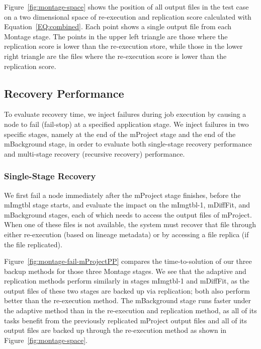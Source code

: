 \documentclass{sig-alternate}
\newcommand{\zhaonote}[1]{{\textcolor{cyan}    { ***Zhao:      #1 }}}
\newcommand{\kylenote}[1]{{\textcolor{orange}    { ***Kyle:      #1 }}}
\newcommand{\zhaonote}[1]{}
\newcommand{\kylenote}[1]{}
\begin{document}
Figure~\ref{fig:montage-space} shows the position of all output files in the test case on a two dimensional space of re-execution and replication score
calculated with Equation~\ref{EQ:combined}.
Each point shows a single output file from each Montage stage. The points in the upper left triangle are those where the replication score is lower than the re-execution store, 
while those in the lower right triangle are the files where the re-execution score is lower than the replication score.

\subsection{Recovery Performance}
To evaluate recovery time, we inject failures during job execution by causing a node to fail (fail-stop) at a specified application stage.
We inject failures in two specific stages, namely at the end of the mProject stage and the end of the mBackground stage,
in order to evaluate both single-stage recovery performance and multi-stage recovery (recursive recovery) performance.

\subsubsection{Single-Stage Recovery}
We first fail a node immediately after the mProject stage finishes, before the mImgtbl stage starts,
and evaluate the impact on the mImgtbl-1, mDiffFit, and mBackground stages, each of which
needs to access the output files of mProject.
When one of these files is not available, the system must recover that file through either re-execution (based on
lineage metadata) or by accessing a file replica (if the file replicated).

Figure~\ref{fig:montage-fail-mProjectPP} compares the time-to-solution of our three backup methods for those three
Montage stages.
We see that the adaptive and replication methods perform similarly in stages mImgtbl-1 and mDiffFit,
as the output files of these two stages are backed up via replication; both also perform better than the re-execution method.
The mBackground stage runs faster under the adaptive method than in the re-execution and replication method,
as all of its tasks benefit from the previously replicated mProject output files and all of its output files are backed up through the re-execution method as shown in Figure~\ref{fig:montage-space}.
\end{document}
